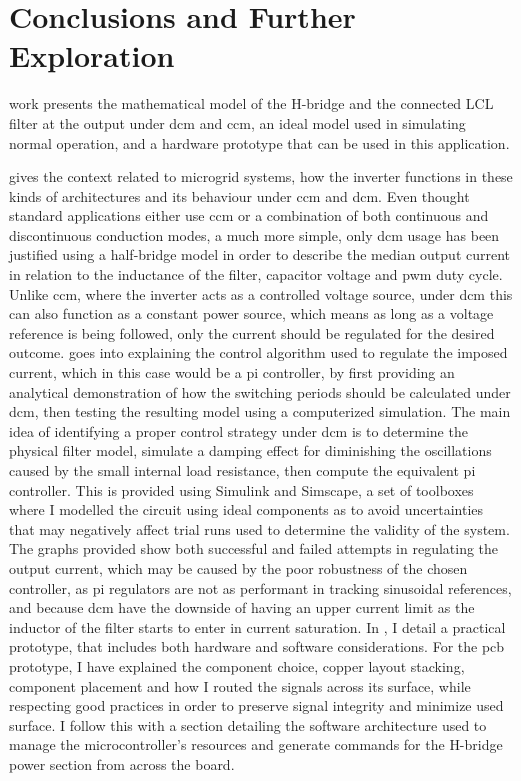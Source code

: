 \chapter{Conclusions and Further Exploration}
\label{chap:conclusions}

 work presents the mathematical model of the \gls{H-bridge} and the connected LCL filter at the output under \gls{dcm} and \gls{ccm}, an ideal model used in simulating normal operation, and a hardware prototype that can be used in this application.

 gives the context related to microgrid systems, how the inverter functions in these kinds of architectures and its behaviour under \gls{ccm} and \gls{dcm}.
Even thought standard applications either use \gls{ccm} or a combination of both continuous and discontinuous conduction modes, a much more simple, only \gls{dcm} usage has been justified using a half-bridge model in order to describe the median output current in relation to the inductance of the filter, capacitor voltage and \gls{pwm} duty cycle.
Unlike \gls{ccm}, where the inverter acts as a controlled voltage source, under \gls{dcm} this can also function as a constant power source, which means as long as a voltage reference is being followed, only the current should be regulated for the desired outcome.
 goes into explaining the control algorithm used to regulate the imposed current, which in this case would be a \gls{pi} controller, by first providing an analytical demonstration of how the switching periods should be calculated under \gls{dcm}, then testing the resulting model using a computerized simulation.
The main idea of identifying a proper control strategy under \gls{dcm} is to determine the physical filter model, simulate a damping effect for diminishing the oscillations caused by the small internal load resistance, then compute the equivalent \gls{pi} controller.
This is provided using Simulink and Simscape, a set of toolboxes where I modelled the circuit using ideal components as to avoid uncertainties that may negatively affect trial runs used to determine the validity of the system.
The graphs provided show both successful and failed attempts in regulating the output current, which may be caused by the poor robustness of the chosen controller, as \gls{pi} regulators are not as performant in tracking sinusoidal references, and because \gls{dcm} have the downside of having an upper current limit as the inductor of the filter starts to enter in current saturation.
In , I detail a practical prototype, that includes both hardware and software considerations.
For the \gls{pcb} prototype, I have explained the component choice, copper layout stacking, component placement and how I routed the signals across its surface, while respecting good practices in order to preserve signal integrity and minimize used surface.
I follow this with a section detailing the software architecture used to manage the microcontroller's resources and generate commands for the \gls{H-bridge} power section from across the board.

